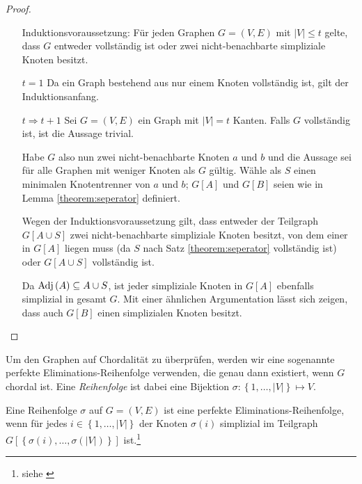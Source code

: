 \begin{proof}

	\begin{itemize}
		\item[Induktionsvoraussetzung:] Für jeden Graphen \( G = \left( V, E \right) \) mit \( \left| V \right| \leq t \) gelte, dass \( G \) entweder vollständig ist oder zwei nicht-benachbarte simpliziale Knoten besitzt.
		\item[\( t = 1 \)] Da ein Graph bestehend aus nur einem Knoten vollständig ist, gilt der Induktionsanfang.
		\item[\( t \Rightarrow t + 1 \)]
		      Sei \( G = \left( V, E \right) \) ein Graph mit \( \left|
		      V \right| = t \) Kanten. Falls \( G \) vollständig ist, ist die Aussage trivial.

		      Habe \( G \) also nun zwei nicht-benachbarte Knoten \( a \) und \( b \) und die Aussage sei für alle Graphen mit weniger Knoten als \( G \) gültig. Wähle als \( S \) einen minimalen Knotentrenner von \( a \) und \( b \); \( G \left[ A \right] \) und \( G \left[ B \right] \) seien wie in Lemma \ref{theorem:seperator} definiert.

		      Wegen der Induktionsvoraussetzung gilt, dass entweder der Teilgraph \( G \left[ A \cup S \right] \) zwei nicht-benachbarte simpliziale Knoten besitzt, von dem einer in \( G \left[ A \right] \) liegen muss (da \( S \) nach Satz \ref{theorem:seperator} vollständig ist) oder \( G \left[A \cup S \right] \) vollständig ist.

		      Da \( \textnormal{Adj} \left( A \right) \subseteq A \cup S \), ist jeder simpliziale Knoten in \( G \left[ A \right] \) ebenfalls simplizial in gesamt \( G \). Mit einer ähnlichen Argumentation lässt sich zeigen, dass auch \( G \left[ B \right] \) einen simplizialen Knoten besitzt.
	\end{itemize}
\end{proof}

Um den Graphen auf Chordalität zu überprüfen, werden wir eine sogenannte perfekte Eliminations-Reihenfolge verwenden, die genau dann existiert, wenn \( G \) chordal ist. Eine \textit{Reihenfolge} ist dabei eine Bijektion \( \sigma: \left\lbrace 1, \ldots, \left| V \right| \right\rbrace \mapsto V \).

\begin{definition}
	Eine Reihenfolge \( \sigma \) auf \( G = \left( V, E \right) \) ist eine perfekte Eliminations-Reihenfolge, wenn für jedes \( i \in \left\lbrace 1, \ldots, \left| V \right| \right\rbrace \) der Knoten \( \sigma \left( i \right) \) simplizial im Teilgraph \( G \left[ \left\lbrace \sigma \left( i \right), \ldots, \sigma \left( \left| V \right| \right) \right\rbrace \right] \) ist.\footnote{siehe \cite[Kapitel 4.2]{golumbic}}
\end{definition}

